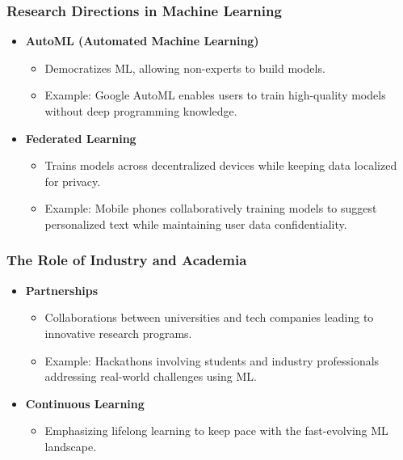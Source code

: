 \documentclass[aspectratio=169]{beamer}
\begin{document}
\begin{frame}[fragile]
    \frametitle{Research Directions in Machine Learning}
    \begin{itemize}
        \item \textbf{AutoML (Automated Machine Learning)}
            \begin{itemize}
                \item Democratizes ML, allowing non-experts to build models.
                \item Example: Google AutoML enables users to train high-quality models without deep programming knowledge.
            \end{itemize}
        
        \item \textbf{Federated Learning}
            \begin{itemize}
                \item Trains models across decentralized devices while keeping data localized for privacy.
                \item Example: Mobile phones collaboratively training models to suggest personalized text while maintaining user data confidentiality.
            \end{itemize}
    \end{itemize}
\end{frame}

\begin{frame}[fragile]
    \frametitle{The Role of Industry and Academia}
    \begin{itemize}
        \item \textbf{Partnerships}
            \begin{itemize}
                \item Collaborations between universities and tech companies leading to innovative research programs.
                \item Example: Hackathons involving students and industry professionals addressing real-world challenges using ML.
            \end{itemize}

        \item \textbf{Continuous Learning}
            \begin{itemize}
                \item Emphasizing lifelong learning to keep pace with the fast-evolving ML landscape.
            \end{itemize}
    \end{itemize}
\end{frame}
\end{document}
